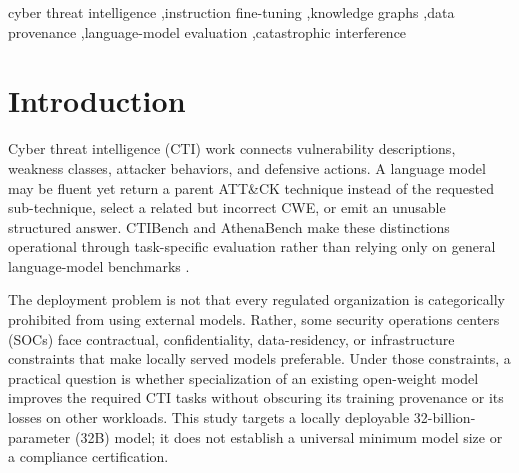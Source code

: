 \documentclass[preprint,12pt,authoryear]{elsarticle}
\makeatletter
\def\els@prelimauthors{}%
\newenvironment{highlights}{%
    \global\setbox\els@hlbox=\vbox\bgroup\hsize=\textwidth\def\baselinestretch{1}%
    \noindent{\Large Highlights}\par\vskip12pt
    \noindent\textbf{\@title}\par\vskip6pt
    \noindent{\let\corref\@gobble\let\fnref\@gobble\let\tnoteref\@gobble
      \def\els@prelimsep{\def\els@prelimsep{, }}\els@prelimauthors}\par\medskip
    \begin{itemize}}{\end{itemize}\egroup}%
\makeatother
\begin{document}
\begin{frontmatter}

\begin{keyword}
cyber threat intelligence \sep instruction fine-tuning \sep knowledge graphs \sep data provenance \sep language-model evaluation \sep catastrophic interference
\end{keyword}

\end{frontmatter}

\linenumbers

\section{Introduction}\label{sec:intro}
Cyber threat intelligence (CTI) work connects vulnerability descriptions, weakness classes, attacker behaviors, and defensive actions. A language model may be fluent yet return a parent ATT\&CK technique instead of the requested sub-technique, select a related but incorrect CWE, or emit an unusable structured answer. CTIBench and AthenaBench make these distinctions operational through task-specific evaluation rather than relying only on general language-model benchmarks \citep{alam2024ctibench,alam2025athenabench}.

The deployment problem is not that every regulated organization is categorically prohibited from using external models. Rather, some security operations centers (SOCs) face contractual, confidentiality, data-residency, or infrastructure constraints that make locally served models preferable. Under those constraints, a practical question is whether specialization of an existing open-weight model improves the required CTI tasks without obscuring its training provenance or its losses on other workloads. This study targets a locally deployable 32-billion-parameter (32B) model; it does not establish a universal minimum model size or a compliance certification.
\end{document}
